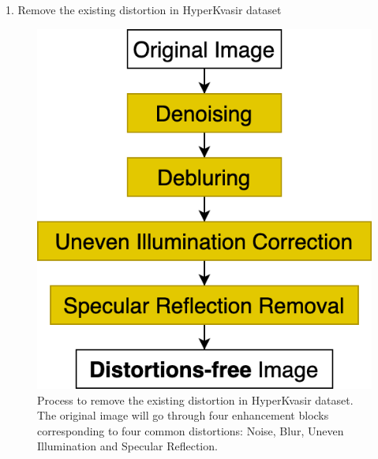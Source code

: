 \documentclass{libs/ufc_format}
\begin{document}
\begin{frame}{1. Remove the existing distortion in HyperKvasir dataset}
    \begin{figure}
        \includegraphics[scale=0.25]{libs/stage1.png}
        \caption{Process to remove the existing distortion in HyperKvasir dataset. The original image will go through four enhancement blocks corresponding to four common distortions: Noise, Blur, Uneven Illumination and Specular Reflection.}
    \end{figure}
\end{frame}
\end{document}
